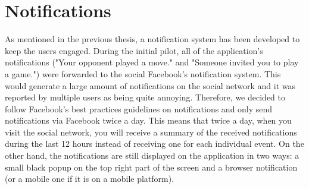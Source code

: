 \section{Notifications}
As mentioned in the previous thesis, a notification system has been developed to keep the users engaged. During the initial pilot, all of the application's notifications ("Your opponent played a move." and "Someone invited you to play a game.") were forwarded to the social Facebook's notification system. This would generate a large amount of notifications on the social network and it was reported by multiple users as being quite annoying.
Therefore, we decided to follow Facebook's best practices guidelines on notifications \cite{fbappnotif} and only send notifications via Facebook twice a day. This means that twice a day, when you visit the social network, you will receive a summary of the received notifications during the last 12 hours instead of receiving one for each individual event. On the other hand, the notifications are still displayed on the application in two ways: a small black popup on the top right part of the screen and a browser notification \cite{browsernotif} (or a mobile one if it is on a mobile platform).